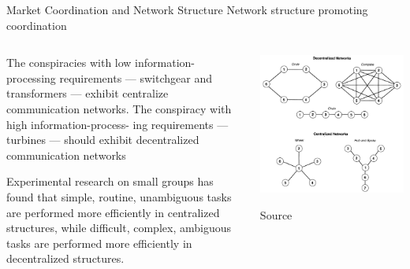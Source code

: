 \documentclass[notes, aspectratio=1610]{beamer}
\begin{document}
\begin{frame}{Market Coordination and Network Structure}
	{Network structure promoting coordination}

	\small

	\begin{columns}
			\begin{column}{0.5\textwidth}

		\begin{tcolorbox}[
			colback=base_c!5!white,
			colframe=base_c!90!black,
			title={\centering Proposition 2}]
			\footnotesize The conspiracies with low information-processing 
			requirements --- switchgear and transformers --- 
			exhibit centralize communication networks.
			The conspiracy with high information-process- ing
			requirements --- turbines --- should exhibit decentralized
			communication networks \end{tcolorbox}

		\begin{tcolorbox}[
			colback=comp_c!5!white,
			colframe=comp_c!90!black,
			title={\centering \small Argument for Proposition 2}]
			\footnotesize Experimental research on small groups has found that 
			simple, routine, unambiguous tasks are performed more 
			efficiently in centralized structures, while difficult, 
			complex, ambiguous tasks are performed more efficiently 
			in decentralized structures.
		\end{tcolorbox}

		\end{column}

		\begin{column}{0.5\textwidth}
			\includegraphics[width=1\textwidth]{images/centralization}

			\raggedleft Source~\cite[][page 849]{baker_faulkner_1993}
		\end{column}

	\end{columns}
\end{frame}
\end{document}
